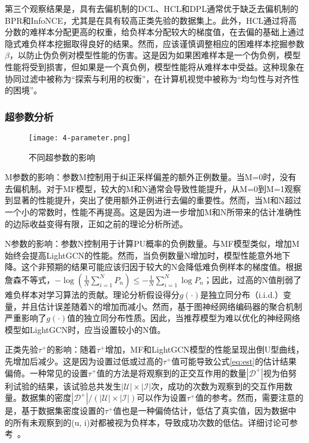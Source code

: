 第三个观察结果是，具有去偏机制的DCL、HCL和DPL通常优于缺乏去偏机制的BPR和InfoNCE，尤其是在具有较高正类先验的数据集上。此外，HCL通过将高分数的难样本分配更高的权重，给负样本分配较大的梯度值，在去偏的基础上通过隐式难负样本挖掘取得良好的结果。然而，应该谨慎调整相应的困难样本挖掘参数$\beta$，以防止伪负例对模型性能的伤害。这是因为如果困难样本是一个伪负例，模型性能将受到损害，但如果是一个真负例，模型性能将从难样本中受益。这种现象在协同过滤中被称为“探索与利用的权衡”\cite{Bin:2023:ICDE}，在计算机视觉中被称为“均匀性与对齐性的困境”\cite{Feng:2021:CVPR}。
\subsubsection{超参数分析}
\begin{figure*}[h!]
	\centering
	\texttt{[image: 4-parameter.png]}
	\caption{不同超参数的影响} %
	\label{Fig:parameter}
\end{figure*}
M参数的影响：参数M控制用于纠正采样偏差的额外正例数量。当M=0时，没有去偏机制。对于MF模型，较大的M和N通常会导致性能提升，从M=0到M=1观察到显著的性能提升，突出了使用额外正例进行去偏的重要性。然而，当M和N超过一个小的常数时，性能不再提高。这是因为进一步增加M和N所带来的估计准确性的边际收益变得有限，正如之前的理论分析所述。

N参数的影响：参数N控制用于计算PU概率的负例数量。与MF模型类似，增加M始终会提高LightGCN的性能。然而，当负例数量N增加时，模型性能意外地下降。这个非预期的结果可能应该归因于较大的N会降低难负例样本的梯度值。根据詹森不等式，$-\log(\frac{1}{N} \sum_{i=1}^N P_n) \leq -\frac{1}{N} \sum_{i=1}^N \log P_n $；因此，过高的N值削弱了难负样本对学习算法的贡献。理论分析假设得分$g(\cdot)$是独立同分布（i.i.d.）变量，并且估计误差随着N的增加而减小。然而，基于图神经网络编码器的聚合机制严重影响了$g(\cdot)$值的独立同分布性质。因此，当推荐模型为难以优化的神经网络模型如LightGCN时，应当设置较小的N值。

正类先验$\tau^+$的影响：随着$\tau^+$增加，MF和LightGCN模型的性能呈现出倒U型曲线，先增加后减少。这是因为设置过低或过高的$\tau^+$值可能导致公式\eqref{eq:est}的估计结果偏倚。一种常见的设置$\tau^+$值的方法是将观察到的正交互作用的数量$|\mathcal{D}^+|$视为伯努利试验的结果，该试验总共发生$|\mathcal{U}|\times |\mathcal{I}|$次，成功的次数为观察到的交互作用数量。数据集的密度$|\mathcal{D}^+|/(|\mathcal{U}|\times |\mathcal{I}|)$可以作为设置$\tau^+$值的参考。然而，需要注意的是，基于数据集密度设置的$\tau^+$值也是一种偏倚估计，低估了真实值，因为数据中的所有未观察到的(u, i)对都被视为负样本，导致成功次数的低估。详细讨论可参考~\cite{Jain:2016:NIPS,Christoffel:2016:ACML}。

